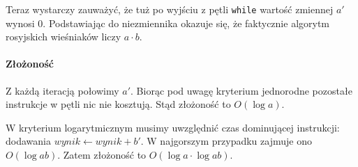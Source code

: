 Teraz wystarczy zauważyć, że tuż po wyjściu z pętli \texttt{while} wartość zmiennej $a'$ wynosi $0$. Podstawiając do niezmiennika okazuje się, że faktycznie algorytm rosyjskich wieśniaków liczy $a \cdot b$.

\paragraph{Złożoność}

Z każdą iteracją połowimy $a'$. Biorąc pod uwagę kryterium jednorodne pozostałe instrukcje w pętli nic nie kosztują. Stąd złożoność to $O(\log a)$.

W kryterium logarytmicznym musimy uwzględnić czas dominującej instrukcji: dodawania  $wynik \leftarrow wynik + b'$. W najgorszym przypadku zajmuje ono $O(\log ab)$. Zatem złożoność to $O(\log a \cdot \log ab)$.